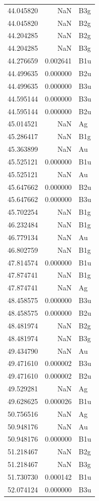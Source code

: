 \begin{longtable}{rrl}
44.045820 & NaN & B3g \\
44.045820 & NaN & B2g \\
44.204285 & NaN & B2g \\
44.204285 & NaN & B3g \\
44.276659 & 0.002641 & B1u \\
44.499635 & 0.000000 & B2u \\
44.499635 & 0.000000 & B3u \\
44.595144 & 0.000000 & B3u \\
44.595144 & 0.000000 & B2u \\
45.014521 & NaN & Ag \\
45.286417 & NaN & B1g \\
45.363899 & NaN & Au \\
45.525121 & 0.000000 & B1u \\
45.525121 & NaN & Au \\
45.647662 & 0.000000 & B2u \\
45.647662 & 0.000000 & B3u \\
45.702254 & NaN & B1g \\
46.232484 & NaN & B1g \\
46.779134 & NaN & Au \\
46.802759 & NaN & B1g \\
47.814574 & 0.000000 & B1u \\
47.874741 & NaN & B1g \\
47.874741 & NaN & Ag \\
48.458575 & 0.000000 & B3u \\
48.458575 & 0.000000 & B2u \\
48.481974 & NaN & B2g \\
48.481974 & NaN & B3g \\
49.434790 & NaN & Au \\
49.471610 & 0.000002 & B3u \\
49.471610 & 0.000002 & B2u \\
49.529281 & NaN & Ag \\
49.628625 & 0.000026 & B1u \\
50.756516 & NaN & Ag \\
50.948176 & NaN & Au \\
50.948176 & 0.000000 & B1u \\
51.218467 & NaN & B2g \\
51.218467 & NaN & B3g \\
51.730730 & 0.000142 & B1u \\
52.074124 & 0.000000 & B3u \\

\end{longtable}
